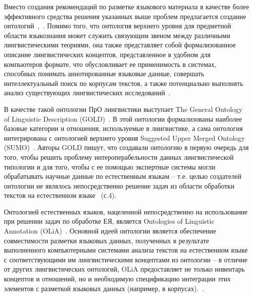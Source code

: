 Вместо создания рекомендаций по разметке языкового материала в качестве более эффективного средства решения указанных выше проблем предлагается создание онтологий~\cite{schalley_2019},~\cite{mccrae_2015}. Помимо того, что онтология верхнего уровня для предметной области языкознания может служить связующим звеном между различными лингвистическими теориями, она также представляет собой формализованное описание лингвистических концептов, представленное в удобном для компьютеров формате, что обусловливает ее применимость в системах, способных понимать аннотированные языковые данные, совершать интеллектуальный поиск по корпусам текстов, а также потенциально выполнять анализ существующих лингвистических исследований~\cite{Farrar2002ACO}.

В качестве такой онтологии ПрО лингвистики выступает The General Ontology of Linguistic Description (GOLD)~\cite{gold}.
В этой онтологии формализованы наиболее базовые категории и отношения, используемые в лингвистике, а сама онтология интегрирована с онтологией верхнего уровня Suggested Upper Merged Ontology (SUMO)~\cite{pease_2002_sumo}. Авторы GOLD пишут, что создавали онтологию в первую очередь для того, чтобы решить проблему интероперабельности данных лингвистической типологии и для того, чтобы с ее помощью экспертные системы могли обрабатывать научные данные по естественным языкам -- т.е. целью создателей онтологии не являлось непосредственно решение задач из области обработки текстов на естественном языке~\cite{farrar_2003} (с.4).

Онтологией естественных языков, нацеленной непосредственно на использование при решении задач по обработке ЕЯ, является Ontologies of Linguistic Annotation (OLiA)~\cite{chiarcos-2012-ontologies}. Основной идеей онтологии является обеспечение совместимости разметки языковых данных, полученных в результате выполненного компьютерными системами анализа текстов на естественном языке с соответствующими им лингвистическими концептами из онтологии -- в отличие от других лингвистических онтологий, OLiA предоставляет не только инвентарь концептов и отношений, но и необходимую спецификацию интеграции этих элементов с разметкой языковых данных (например, в корпусах).~\cite[p.~4]{chiarcos-2012-ontologies}.

